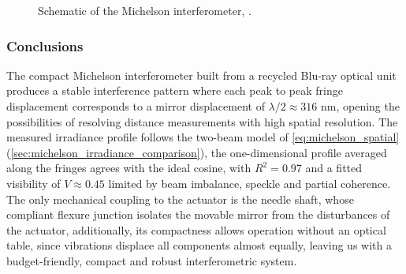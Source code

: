 \begin{figure}[htbp]
    \caption{Schematic of the Michelson interferometer, \cite[Chap 8.]{pedrottiIntroductionOptics2007}.}
    \label{fig:schematic_michelson_interferometer}
\end{figure}






\subsubsection{Conclusions}
\label{sec:interferometer_conclusions}

The compact Michelson interferometer built from a recycled Blu-ray optical unit produces a stable interference pattern where each peak to peak fringe displacement corresponds to a mirror displacement of $\lambda/2 \approx 316\text{ nm}$, opening the possibilities of resolving distance measurements with high spatial resolution. The measured irradiance profile follows the two-beam model of \cref{eq:michelson_spatial} (\cref{sec:michelson_irradiance_comparison}), the one-dimensional profile averaged along the fringes agrees with the ideal cosine, with $R^2 = 0.97$ and a fitted visibility of $V \approx 0.45$ limited by beam imbalance, speckle and partial coherence. The only mechanical coupling to the actuator is the needle shaft, whose compliant flexure junction isolates the movable mirror from the disturbances of the actuator, additionally, its compactness allows operation without an optical table, since vibrations displace all components almost equally, leaving us with a budget-friendly, compact and robust interferometric system.
